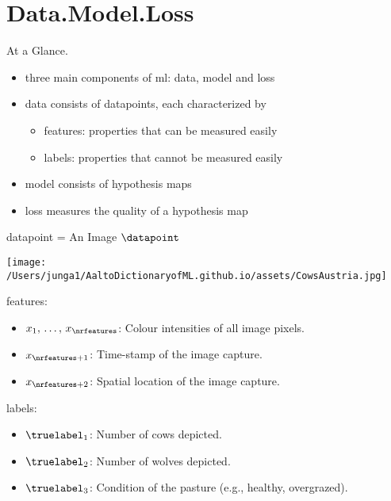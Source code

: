 \documentclass[12pt]{beamer}
\newcounter{sessionframe}[section]
\newcommand{\sessionstart}[1]{\section{#1}\setcounter{sessionframe}{0}}
\begin{document}
	
\sessionstart{Data.Model.Loss}
	\begin{frame}{At a Glance.}
		\begin{itemize}
			\item three main components of \gls{ml}: \gls{data}, \gls{model} and \gls{loss} \\[3mm]
			\item \gls{data} consists of \glspl{datapoint}, each characterized by  
			\begin{itemize} 
				\item \glspl{feature}: properties that can be measured easily \\[2mm]
				\item \glspl{label}: properties that cannot be measured easily \\[2mm]
			\end{itemize} 
			\item \gls{model} consists of \gls{hypothesis} maps  \\[3mm]
			\item \gls{loss} measures the quality of a \gls{hypothesis} map  
		\end{itemize}
	\end{frame}
	
	\begin{frame}{\Gls{datapoint} = An Image $\datapoint$}
			\begin{minipage}[t]{0.4\textwidth}
				\centering
				\texttt{[image: /Users/junga1/AaltoDictionaryofML.github.io/assets/CowsAustria.jpg]}
				\vspace{1mm}
			\end{minipage}

				\Glspl{feature}:
				\begin{itemize}
					\item $x_{1}, \,\ldots, \,x_{\nrfeatures}$: Colour intensities of all image pixels.
					\item $x_{\nrfeatures+1}$: Time-stamp of the image capture.
					\item $x_{\nrfeatures+2}$: Spatial location of the image capture.
				\end{itemize}
				\Glspl{label}:
				\begin{itemize}
					\item $\truelabel_{1}$: Number of cows depicted. 
					\item $\truelabel_{2}$: Number of wolves depicted. 
					\item $\truelabel_{3}$: Condition of the pasture (e.g., healthy, overgrazed).
				\end{itemize}
	\end{frame}
	
\end{document}
